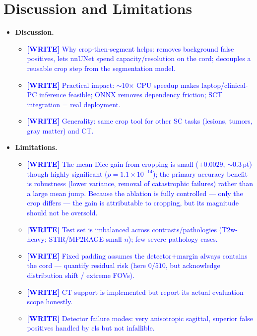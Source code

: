\documentclass[11pt]{article}
\newcommand{\WRITE}[1]{\textcolor{blue}{\textbf{[WRITE]} #1}}
\begin{document}
\section{Discussion and Limitations}\label{sec:discussion}
\begin{itemize}
  \item \textbf{Discussion.}
    \begin{itemize}
      \item \WRITE{Why crop-then-segment helps: removes background false
            positives, lets nnUNet spend capacity/resolution on the cord;
            decouples a reusable crop step from the segmentation model.}
      \item \WRITE{Practical impact: $\sim$10$\times$ CPU speedup makes
            laptop/clinical-PC inference feasible; ONNX removes dependency
            friction; SCT integration = real deployment.}
      \item \WRITE{Generality: same crop tool for other SC tasks (lesions,
            tumors, gray matter) and CT.}
    \end{itemize}
  \item \textbf{Limitations.}
    \begin{itemize}
      \item \WRITE{The mean Dice gain from cropping is small ($+0.0029$, $\sim
            0.3$\,pt) though highly significant ($p=1.1\times10^{-14}$); the
            primary accuracy benefit is robustness (lower variance, removal of
            catastrophic failures) rather than a large mean jump. Because the
            ablation is fully controlled --- only the crop differs --- the gain is
            attributable to cropping, but its magnitude should not be oversold.}
      \item \WRITE{Test set is imbalanced across contrasts/pathologies
            (T2w-heavy; STIR/MP2RAGE small $n$); few severe-pathology cases.}
      \item \WRITE{Fixed padding assumes the detector+margin always contains
            the cord — quantify residual risk (here $0/510$, but acknowledge
            distribution shift / extreme FOVs).}
      \item \WRITE{CT support is implemented but report its actual evaluation
            scope honestly.}
      \item \WRITE{Detector failure modes: very anisotropic sagittal,
            superior false positives handled by cls but not infallible.}
    \end{itemize}
\end{itemize}
\end{document}
